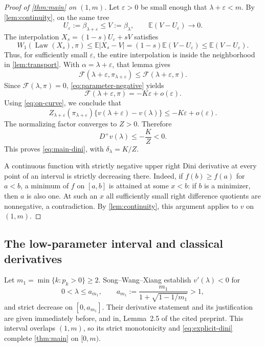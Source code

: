 \documentclass[11pt,a4paper]{article}
\numberwithin{equation}{section}
\theoremstyle{notethm}
\theoremstyle{definition}
\newcommand{\E}{\mathbb E}
\newcommand{\Law}{\operatorname{Law}}
\newcommand{\Dplus}{D^{+}}
\newcommand{\cF}{\mathscr F}
\begin{document}
\begin{proof}[Proof of \cref{thm:main} on $(1,m)$]
Let $\varepsilon>0$ be small enough that $\lambda+\varepsilon<m$.
By \cref{lem:continuity}, on the same tree
\[
 U_\varepsilon:=\beta_{\lambda+\varepsilon}\le
 V:=\beta_\lambda,
 \qquad \E(V-U_\varepsilon)\longrightarrow0.
\]
The interpolation $X_s=(1-s)U_\varepsilon+sV$ satisfies
\begin{equation}\label{eq:interpolation-ball}
 W_1(\Law(X_s),\pi)
 \le\E|X_s-V|
 =(1-s)\E(V-U_\varepsilon)
 \le\E(V-U_\varepsilon).
\end{equation}
Thus, for sufficiently small $\varepsilon$, the entire interpolation is
inside the neighborhood in \cref{lem:transport}. With
$\alpha=\lambda+\varepsilon$, that lemma gives
\begin{equation}\label{eq:law-comparison}
 \cF(\lambda+\varepsilon,\pi_{\lambda+\varepsilon})
 \le\cF(\lambda+\varepsilon,\pi).
\end{equation}
Since $\cF(\lambda,\pi)=0$, \eqref{eq:parameter-negative} yields
\[
 \cF(\lambda+\varepsilon,\pi)=-K\varepsilon+o(\varepsilon).
\]
Using \eqref{eq:on-curve}, we conclude that
\begin{equation}\label{eq:finite-comparison}
 Z_{\lambda+\varepsilon}(\pi_{\lambda+\varepsilon})
 \{v(\lambda+\varepsilon)-v(\lambda)\}
 \le-K\varepsilon+o(\varepsilon).
\end{equation}
The normalizing factor converges to $Z>0$. Therefore
\begin{equation}\label{eq:explicit-dini}
 \boxed{\quad \Dplus v(\lambda)\le-\frac KZ<0.\quad}
\end{equation}
This proves \eqref{eq:main-dini}, with $\delta_\lambda=K/Z$.

A continuous function with strictly negative upper right Dini derivative at
every point of an interval is strictly decreasing there. Indeed, if
$f(b)\ge f(a)$ for $a<b$, a minimum of $f$ on $[a,b]$ is attained at some
$x<b$: if $b$ is a minimizer, then $a$ is also one. At such an $x$ all
sufficiently small right difference quotients are nonnegative, a
contradiction. By \cref{lem:continuity}, this argument applies to $v$ on
$(1,m)$.
\end{proof}

\subsection{The low-parameter interval and classical derivatives}

Let $m_1=\min\{k:p_k>0\}\ge2$. Song--Wang--Xiang
\cite[Theorem~1.2 and Lemma~2.5]{SWX} establish $v'(\lambda)<0$ for
\begin{equation}\label{eq:low-range}
 0<\lambda\le a_{m_1},\qquad
 a_{m_1}:=\frac{m_1}{1+\sqrt{1-1/m_1}}>1,
\end{equation}
and strict decrease on $[0,a_{m_1}]$. Their derivative statement and its
justification are given immediately before, and in, Lemma~2.5 of the cited
preprint. This interval overlaps $(1,m)$, so its strict monotonicity and
\eqref{eq:explicit-dini} complete \cref{thm:main} on $[0,m)$.
\end{document}
